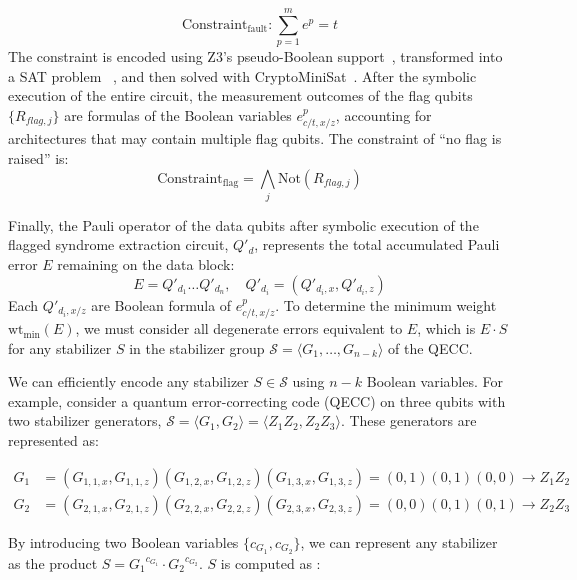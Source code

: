 \documentclass[acmsmallw,review]{acmart}
\begin{document}
\begin{equation}
\mathrm{Constraint}_{\mathrm{fault}} : \sum_{p=1}^{m} e^{p}= t
\end{equation}
The constraint is encoded using Z3's pseudo-Boolean support~\cite{Z3}, transformed into a SAT problem ~\cite{pseudo_bool_article}, and then solved with CryptoMiniSat~\cite{cryptominisat}.
After the symbolic execution of the entire circuit, the measurement outcomes of the flag qubits $\{R_{flag,j}\}$ are formulas of the Boolean variables $e^{p}_{c/t, x/z}$, accounting for architectures that may contain multiple flag qubits. The constraint of ``no flag is raised'' is:
\begin{equation}
\mathrm{Constraint_{flag}} = \bigwedge_{j} \mathrm{Not}(R_{flag,j})
\end{equation}

Finally, the Pauli operator of the data qubits after symbolic execution of the flagged syndrome extraction circuit, $Q'_d$, represents the total accumulated Pauli error $E$ remaining on the data block:
\begin{equation}
E = Q'_{d_1}  \dots Q'_{d_n}, \quad Q'_{d_i} = (Q'_{d_i,x}, Q'_{d_i,z})
\end{equation}
Each $Q'_{d_i, x/z}$ are Boolean formula of  $e^{p}_{c/t, x/z}$.
To determine the minimum weight $\mathrm{wt}_{\min}(E)$, we must consider all degenerate errors equivalent to $E$, which is $E \cdot S$ for any stabilizer $S$ in the stabilizer group $\mathcal{S} = \langle G_1, \dots, G_{n-k} \rangle$ of the QECC. 


We can efficiently encode any stabilizer $S \in \mathcal{S}$ using $n-k$ Boolean variables. For example, consider a quantum error-correcting code (QECC) on three qubits with two stabilizer generators, $\mathcal{S} = \langle G_1, G_2 \rangle = \langle Z_1Z_2, Z_2Z_3 \rangle$. These generators are represented as:

{\small
\begin{equation*}
\begin{aligned}
G_1 &= (G_{1,1,x}, G_{1,1,z})(G_{1,2,x}, G_{1,2,z})(G_{1,3,x}, G_{1,3,z}) = (0,1)(0,1)(0,0) \to Z_1Z_2 \\
G_2 &= (G_{2,1,x}, G_{2,1,z})(G_{2,2,x}, G_{2,2,z})(G_{2,3,x}, G_{2,3,z}) = (0,0)(0,1)(0,1) \to Z_2Z_3
\end{aligned}
\end{equation*}
}

By introducing two  Boolean variables $\{c_{G_1}, c_{G_2}\}$, we can represent any stabilizer as the product $S = {G_1}^{c_{G_1}} \cdot {G_2}^{c_{G_2}}$.  $S$ is computed as :
\end{document}
